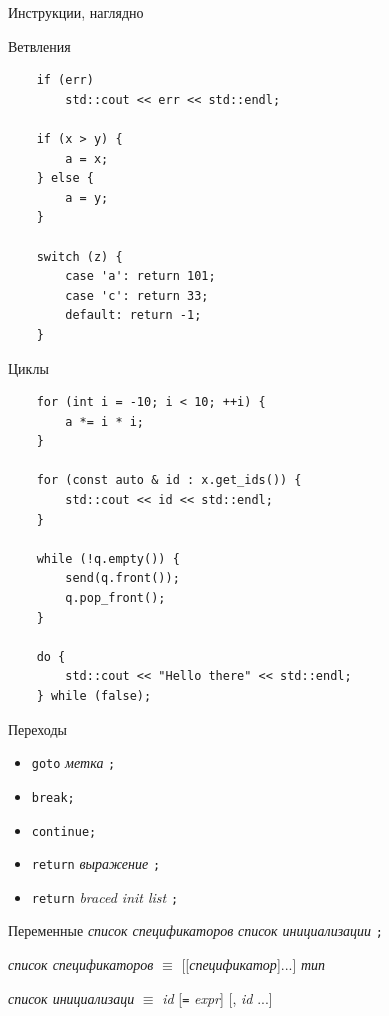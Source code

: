 \documentclass[unknownkeysallowed,xcolor=table]{beamer}
\begin{document}
\begin{frame}{Инструкции, наглядно}
\end{frame}

\begin{frame}[fragile]{Ветвления}
  \begin{lstlisting}
    if (err)
        std::cout << err << std::endl;

    if (x > y) {
        a = x;
    } else {
        a = y;
    }

    switch (z) {
        case 'a': return 101;
        case 'c': return 33;
        default: return -1;
    }
  \end{lstlisting}
\end{frame}

\begin{frame}[fragile]{Циклы}
  \begin{lstlisting}
    for (int i = -10; i < 10; ++i) {
        a *= i * i;
    }

    for (const auto & id : x.get_ids()) {
        std::cout << id << std::endl;
    }

    while (!q.empty()) {
        send(q.front());
        q.pop_front();
    }

    do {
        std::cout << "Hello there" << std::endl;
    } while (false);
  \end{lstlisting}
\end{frame}

\begin{frame}[fragile]{Переходы}
  \begin{itemize}
    \item \lstinline{goto} \emph{метка} \lstinline{;}
    \item \lstinline{break;}
    \item \lstinline{continue;}
    \item \lstinline{return} \emph{выражение} \lstinline{;}
    \item \lstinline{return} \emph{braced init list} \lstinline{;}
  \end{itemize}
\end{frame}

\begin{frame}[fragile]{Переменные}
  \emph{список спецификаторов} \emph{список инициализации} \lstinline{;}

  \vspace{1em}

  \emph{список спецификаторов} $\equiv$ [[\emph{спецификатор}]...] \emph{тип}

  \vspace{1em}

  \emph{список инициализаци} $\equiv$ \emph{id} [\lstinline{=} \emph{expr}] [, \emph{id} ...]
\end{frame}
\end{document}
